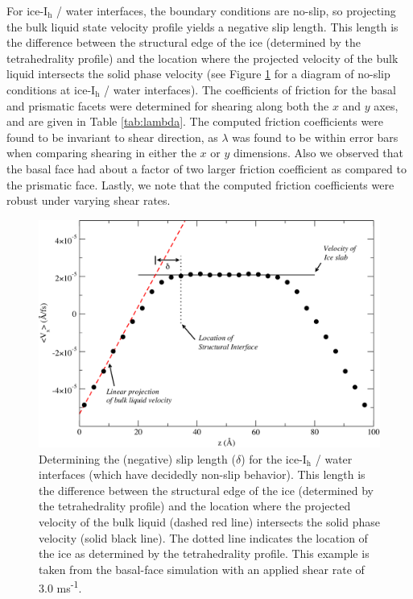 For ice-I$_\mathrm{h}$ / water interfaces, the boundary conditions are
no-slip, so projecting the bulk liquid state velocity profile yields a
negative slip length. This length is the difference between the
structural edge of the ice (determined by the tetrahedrality profile)
and the location where the projected velocity of the bulk liquid
intersects the solid phase velocity (see Figure
\ref{fig:delta_example} for a diagram of no-slip conditions at
ice-I$_\mathrm{h}$ / water interfaces). The coefficients of friction
for the basal and prismatic facets were determined for shearing along
both the $x$ and $y$ axes, and are given in Table
\ref{tab:lambda}. The computed friction coefficients were found to be
invariant to shear direction, as $\lambda$ was found to be within
error bars when comparing shearing in either the $x$ or $y$
dimensions. Also we observed that the basal face had about a factor of
two larger friction coefficient as compared to the prismatic
face. Lastly, we note that the computed friction coefficients were
robust under varying shear rates.

\begin{figure}
\includegraphics[width=\linewidth]{Figures/delta_example}
\caption{\label{fig:delta_example} Determining the (negative) slip
  length ($\delta$) for the ice-I$_\mathrm{h}$ / water interfaces
  (which have decidedly non-slip behavior).  This length is the
  difference between the structural edge of the ice (determined by the
  tetrahedrality profile) and the location where the projected
  velocity of the bulk liquid (dashed red line) intersects the solid
  phase velocity (solid black line).  The dotted line indicates the
  location of the ice as determined by the tetrahedrality profile.
  This example is taken from the basal-face simulation with an applied
  shear rate of 3.0 ms\textsuperscript{-1}.}
\end{figure}

